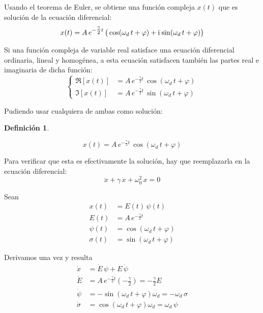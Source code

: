 \documentclass[a5paper,12pt,twoside]{book}
\newtheorem{defn}{{Definición}}[chapter]
\begin{document}
Usando el teorema de Euler, se obtiene una función compleja $x(t)$ que es solución de la ecuación diferencial:
\[
    x(t) = A \, e^{-\tfrac{\gamma}{2} t} \, \big( \cos(\omega_d \, t + \varphi) + \mathrm{i}\mkern1mu \sin(\omega_d \, t + \varphi) \big)
\]

Si una función compleja de variable real satisface una ecuación diferencial ordinaria, lineal y homogénea, a esta ecuación satisfacen también las partes real e imaginaria de dicha función:
\[
    \left\{
    \begin{aligned}
        \Re[x(t)] &= A \, e^{-\tfrac{\gamma}{2}t} \, \cos(\omega_d \, t + \varphi)
        \\
        \Im[x(t)] &= A \, e^{-\tfrac{\gamma}{2}t} \, \sin(\omega_d \, t + \varphi)
    \end{aligned}
    \right.
\]

Pudiendo usar cualquiera de ambas como solución:

\begin{mdframed}[style=MyFrame1]
    \begin{defn}
    \end{defn}
    \begin{equation*}
        x(t) = A \, e^{-\tfrac{\gamma}{2}t} \, \cos{(\omega_d \, t + \varphi)}
    \end{equation*}
\end{mdframed}

\begin{center}
    \def\svgwidth{0.8\linewidth}
    
\end{center}

Para verificar que esta es efectivamente la solución, hay que reemplazarla en la ecuación diferencial:
\[
    \ddot{x} + \gamma \, \dot{x} + \omega_{0}^{2} \, x = 0
\]

Sean
\begin{align*}
    x(t) &= E(t) \, \psi(t)
    \\
    E(t) &= A \, e^{-\frac{\gamma}{2} t}
    \\
    \psi(t) &= \cos \left( \omega_d \, t + \varphi \right)
    \\
    \sigma(t) &= \sin \left( \omega_d \, t + \varphi \right)
\end{align*}

Derivamos una vez y resulta
\begin{align*}
    \dot{x} &= \dot{E} \, \psi + E \, \dot{\psi}
    \\
    \dot{E} &= A \, e^{-\frac{\gamma}{2} t} \left( - \frac{\gamma}{2} \right)
    = - \frac{\gamma}{2} E
    \\
    \dot{\psi} &= - \sin \left( \omega_d \, t + \varphi \right) \omega_d
    = - \omega_d \, \sigma
    \\
    \dot{\sigma} &= \cos \left( \omega_d \, t + \varphi \right) \omega_d
    = \omega_d \, \psi
\end{align*}
\end{document}
